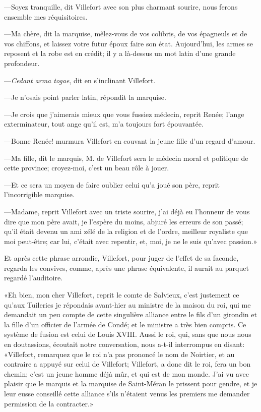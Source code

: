 —Soyez tranquille, dit Villefort avec son plus charmant sourire, nous ferons ensemble mes réquisitoires.

—Ma chère, dit la marquise, mêlez-vous de vos colibris, de vos épagneuls et de vos chiffons, et laissez votre futur époux faire son état. Aujourd'hui, les armes se reposent et la robe est en crédit; il y a là-dessus un mot latin d'une grande profondeur.

—\textit{Cedant arma togae}, dit en s'inclinant Villefort.

—Je n'osais point parler latin, répondit la marquise.

—Je crois que j'aimerais mieux que vous fussiez médecin, reprit Renée; l'ange exterminateur, tout ange qu'il est, m'a toujours fort épouvantée.

—Bonne Renée! murmura Villefort en couvant la jeune fille d'un regard d'amour.

—Ma fille, dit le marquis, M. de Villefort sera le médecin moral et politique de cette province; croyez-moi, c'est un beau rôle à jouer.

—Et ce sera un moyen de faire oublier celui qu'a joué son père, reprit l'incorrigible marquise.

—Madame, reprit Villefort avec un triste sourire, j'ai déjà eu l'honneur de vous dire que mon père avait, je l'espère du moins, abjuré les erreurs de son passé; qu'il était devenu un ami zélé de la religion et de l'ordre, meilleur royaliste que moi peut-être; car lui, c'était avec repentir, et, moi, je ne le suis qu'avec passion.»

Et après cette phrase arrondie, Villefort, pour juger de l'effet de sa faconde, regarda les convives, comme, après une phrase équivalente, il aurait au parquet regardé l'auditoire.

«Eh bien, mon cher Villefort, reprit le comte de Salvieux, c'est justement ce qu'aux Tuileries je répondais avant-hier au ministre de la maison du roi, qui me demandait un peu compte de cette singulière alliance entre le fils d'un girondin et la fille d'un officier de l'armée de Condé; et le ministre a très bien compris. Ce système de fusion est celui de Louis XVIII. Aussi le roi, qui, sans que nous nous en doutassions, écoutait notre conversation, nous a-t-il interrompus en disant: «Villefort, remarquez que le roi n'a pas prononcé le nom de Noirtier, et au contraire a appuyé sur celui de Villefort; Villefort, a donc dit le roi, fera un bon chemin; c'est un jeune homme déjà mûr, et qui est de mon monde. J'ai vu avec plaisir que le marquis et la marquise de Saint-Méran le prissent pour gendre, et je leur eusse conseillé cette alliance s'ils n'étaient venus les premiers me demander permission de la contracter.»

